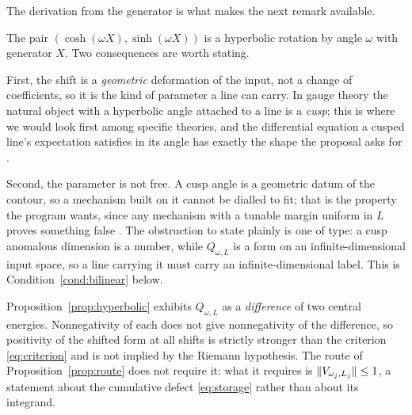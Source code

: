 The derivation from the generator is what makes the next remark available.

\begin{remark}\label{rem:angle}
The pair $(\cosh(\omega X),\sinh(\omega X))$ is a hyperbolic rotation by angle
$\omega$ with generator $X$. Two consequences are worth stating.

First, the shift is a \emph{geometric} deformation of the input, not a change of
coefficients, so it is the kind of parameter a line can carry. In gauge theory
the natural object with a hyperbolic angle attached to a line is a \emph{cusp};
this is where we would look first among specific theories, and the differential
equation a cusped line's expectation satisfies in its angle has exactly the
shape the proposal asks for \cite{CHMS}.

Second, the parameter is not free. A cusp angle is a geometric datum of the
contour, so a mechanism built on it cannot be dialled to fit; that is the
property the program wants, since any mechanism with a tunable margin uniform in
$L$ proves something false \cite{Selection}. The obstruction to state plainly is
one of type: a cusp anomalous dimension is a number, while $Q_{\omega,L}$ is a
form on an infinite-dimensional input space, so a line carrying it must carry an
infinite-dimensional label. This is Condition~\ref{cond:bilinear} below.
\end{remark}

\begin{remark}
\label{rem:not-criterion}
Proposition~\ref{prop:hyperbolic} exhibits $Q_{\omega,L}$ as a \emph{difference}
of two central energies. Nonnegativity of each does not give nonnegativity of the
difference, so positivity of the shifted form at all shifts is strictly stronger
than the criterion \eqref{eq:criterion} and is not implied by the Riemann
hypothesis. The route of Proposition~\ref{prop:route} does not require it: what
it requires is $\lVert V_{\omega_j,L_j}\rVert\leq1$, a statement about the cumulative
defect \eqref{eq:storage} rather than about its integrand.
\end{remark}
